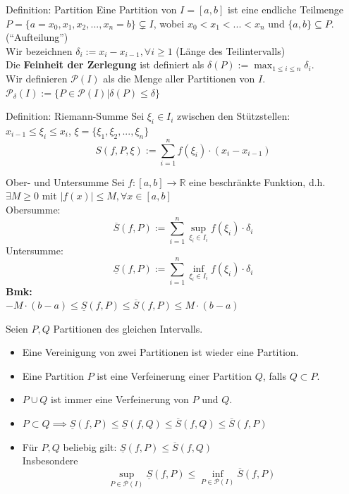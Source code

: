 \documentclass[a4paper,fontsize = 7pt]{scrartcl}
\def\R{\mathbb{R}}
\begin{document}
\begin{subbox}{Definition: Partition}
  \vspace{-4pt}
 Eine Partition von $I = [a, b]$ ist eine endliche Teilmenge $P = \{a = x_0, x_1, x_2, ..., x_n = b\} \subsetneq I$, wobei $x_0 < x_1 < ... < x_n$ und $\{a,b\} \subseteq P$. (``Aufteilung'')
 \\Wir bezeichnen $\delta_i := x_i - x_{i-1}, \forall i \geq 1 $ (Länge des Teilintervalls)
 \\Die \textbf{Feinheit der Zerlegung} ist definiert als $\delta(P) := \max_{1 \leq i \leq n} \delta_i$.
 \\Wir definieren $\mathcal{P}(I)$ als die Menge aller Partitionen von $I$.
 \\$\mathcal{P}_{\delta}(I) := \{P \in \mathcal{P}(I) \vert \delta(P) \leq \delta\}$
 \vspace{-6pt}
\end{subbox}


\begin{mainbox}{Definition: Riemann-Summe}
  \vspace{-4pt}
  Sei $\xi_i \in I_i$ zwischen den Stützstellen: \\$x_{i-1} \leq \xi_i \leq x_i$, 
  $\xi = \{\xi_1, \xi_2, ..., \xi_n \}$
 $$S(f, P, \xi) := \sum_{i=1}^n f(\xi_i) \cdot (x_i - x_{i-1})$$
 \vspace{-12pt}
\end{mainbox}

\begin{subbox}{Ober- und Untersumme}
  \vspace{-4pt}
  Sei $f: [a, b] \to \R$ eine beschränkte Funktion, d.h. $\exists M \geq 0$ mit $|f(x)| \leq M, \forall x \in [a,b]$
\\ Obersumme: $$\overline{S}(f,P) := \sum_{i = 1}^{n}\sup_{\xi_i \in I_i} f(\xi_i) \cdot \delta_i$$ 
 Untersumme: $$\underline{S}(f,P) := \sum_{i = 1}^{n}\inf_{\xi_i \in I_i} f(\xi_i) \cdot \delta_i$$
 \textbf{Bmk:}
 \\$-M \cdot (b-a) \leq \underline{S}(f,P) \leq \overline{S}(f,P) \leq M \cdot (b-a)$
 \vspace{-4pt}
\end{subbox}

Seien $P, Q$ Partitionen des gleichen Intervalls.
\begin{itemize}
  \item Eine Vereinigung von zwei Partitionen ist wieder eine Partition.
  \item Eine Partition $P$ ist eine Verfeinerung einer Partition $Q$, falls $Q \subset P$.
  \item $P \cup Q$ ist immer eine Verfeinerung von $P$ und $Q$.
  \item $P \subset Q \implies \underline{S}(f, P) \leq \underline{S}(f, Q) \leq \overline{S}(f, Q) \leq \overline{S}(f, P)$
  \item Für $P, Q$ beliebig gilt: $\underline{S}(f, P) \leq \overline{S}(f, Q)$
  \\Insbesondere $$\sup_{P \in \mathcal{P}(I)} \underline{S}(f, P) \leq \inf_{P \in \mathcal{P}(I)} \overline{S}(f, P)$$
\end{itemize}
\end{document}
